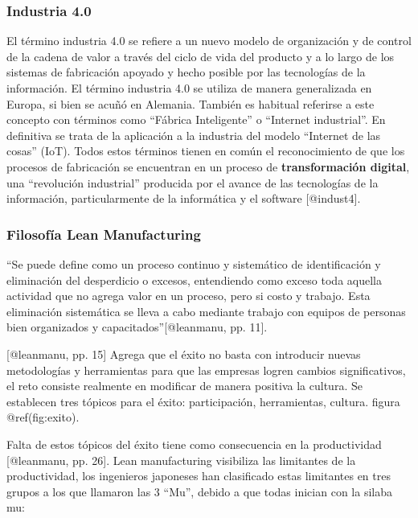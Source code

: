 \documentclass[
]{article}
\begin{document}
\hypertarget{industria-4.0}{%
\subsubsection{Industria 4.0}\label{industria-4.0}}

El término industria 4.0 se refiere a un nuevo modelo de organización y
de control de la cadena de valor a través del ciclo de vida del producto
y a lo largo de los sistemas de fabricación apoyado y hecho posible por
las tecnologías de la información. El término industria 4.0 se utiliza
de manera generalizada en Europa, si bien se acuñó en Alemania. También
es habitual referirse a este concepto con términos como ``Fábrica
Inteligente'' o ``Internet industrial''. En definitiva se trata de la
aplicación a la industria del modelo ``Internet de las cosas'' (IoT).
Todos estos términos tienen en común el reconocimiento de que los
procesos de fabricación se encuentran en un proceso de
\textbf{transformación digital}, una ``revolución industrial'' producida
por el avance de las tecnologías de la información, particularmente de
la informática y el software {[}@indust4{]}.

\hypertarget{filosofuxeda-lean-manufacturing}{%
\subsubsection{Filosofía Lean
Manufacturing}\label{filosofuxeda-lean-manufacturing}}

``Se puede define como un proceso continuo y sistemático de
identificación y eliminación del desperdicio o excesos, entendiendo como
exceso toda aquella actividad que no agrega valor en un proceso, pero si
costo y trabajo. Esta eliminación sistemática se lleva a cabo mediante
trabajo con equipos de personas bien organizados y
capacitados''{[}@leanmanu, pp. 11{]}.

{[}@leanmanu, pp. 15{]} Agrega que el éxito no basta con introducir
nuevas metodologías y herramientas para que las empresas logren cambios
significativos, el reto consiste realmente en modificar de manera
positiva la cultura. Se establecen tres tópicos para el éxito:
participación, herramientas, cultura. figura @ref(fig:exito).

Falta de estos tópicos del éxito tiene como consecuencia en la
productividad {[}@leanmanu, pp. 26{]}. Lean manufacturing visibiliza las
limitantes de la productividad, los ingenieros japoneses han clasificado
estas limitantes en tres grupos a los que llamaron las 3 ``Mu'', debido
a que todas inician con la silaba mu:
\end{document}
